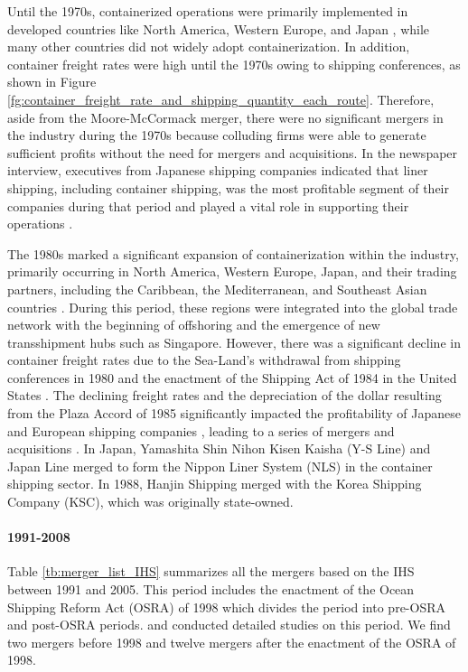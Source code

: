 \documentclass[10pt]{article}
\begin{document}
Until the 1970s, containerized operations were primarily implemented in developed countries like North America, Western Europe, and Japan \citep{GUERRERO2014151}, while many other countries did not widely adopt containerization.
In addition, container freight rates were high until the 1970s owing to shipping conferences, as shown in Figure \ref{fg:container_freight_rate_and_shipping_quantity_each_route}.
Therefore, aside from the Moore-McCormack merger, there were no significant mergers in the industry during the 1970s because colluding firms were able to generate sufficient profits without the need for mergers and acquisitions. In the newspaper interview, executives from Japanese shipping companies indicated that liner shipping, including container shipping, was the most profitable segment of their companies during that period and played a vital role in supporting their operations \citep{sato2006}.


The 1980s marked a significant expansion of containerization within the industry, primarily occurring in North America, Western Europe, Japan, and their trading partners, including the Caribbean, the Mediterranean, and Southeast Asian countries \citep{GUERRERO2014151}. During this period, these regions were integrated into the global trade network with the beginning of offshoring and the emergence of new transshipment hubs such as Singapore. However, there was a significant decline in container freight rates due to the Sea-Land's withdrawal from shipping conferences in 1980 and the enactment of the Shipping Act of 1984 in the United States \citep{matsuda2022unified}. 
The declining freight rates and the depreciation of the dollar resulting from the Plaza Accord of 1985 significantly impacted the profitability of Japanese and European shipping companies \citep{Matsuda2018}, leading to a series of mergers and acquisitions .
In Japan, Yamashita Shin Nihon Kisen Kaisha (Y-S Line) and Japan Line merged to form the Nippon Liner System (NLS) in the container shipping sector. In 1988, Hanjin Shipping merged with the Korea Shipping Company (KSC), which was originally state-owned. %

\paragraph{1991-2008}

Table \ref{tb:merger_list_IHS} summarizes all the mergers based on the IHS between 1991 and 2005.
This period includes the enactment of the Ocean Shipping Reform Act (OSRA) of 1998 which divides the period into pre-OSRA and post-OSRA periods. 
\cite{fusillo2006some,fusillo2013stability} and \cite{reitzes2002rolling} conducted detailed studies on this period.
We find two mergers before 1998 and twelve mergers after the enactment of the OSRA of 1998.
\end{document}
